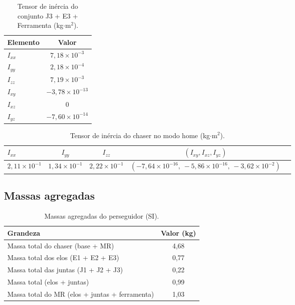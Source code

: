 \begin{table}[H]
\centering
\caption{Tensor de inércia do conjunto J3 + E3 + Ferramenta (kg$\cdot$m$^2$).}
\label{tab:B14_I_J3E3F}
\begin{tabular}{lc}
\hline
\textbf{Elemento} & \textbf{Valor} \\
\hline
$I_{xx}$ & $7,18\times 10^{-3}$ \\
$I_{yy}$ & $2,18\times 10^{-4}$ \\
$I_{zz}$ & $7,19\times 10^{-3}$ \\
$I_{xy}$ & $-3,78\times 10^{-13}$ \\
$I_{xz}$ & $0$ \\
$I_{yz}$ & $-7,60\times 10^{-14}$ \\
\hline
\end{tabular}
\end{table}


\begin{table}[H]
\centering
\caption{Tensor de inércia do chaser no modo home (kg$\cdot$m$^2$).}
\label{tab:chaser_I_home_SI}
\begin{tabular}{lcccc}
\hline
$I_{xx}$ & $I_{yy}$ & $I_{zz}$ & $(I_{xy}, I_{xz}, I_{yz})$ \\
\hline
$2,11\times 10^{-1}$ &
$1,34\times 10^{-1}$ &
$2,22\times 10^{-1}$ &
$(-7,64\times 10^{-16},\ -5,86\times 10^{-16},\ -3,62\times 10^{-2})$ \\
\hline
\end{tabular}
\end{table}

\subsection{Massas agregadas}

\begin{table}[H]
\centering
\caption{Massas agregadas do perseguidor (SI).}
\label{tab:chaser_massas_agregadas_SI}
\begin{tabular}{lc}
\hline
\textbf{Grandeza} & \textbf{Valor (kg)} \\
\hline
Massa total do chaser (base + MR) & 4,68 \\
Massa total dos elos (E1 + E2 + E3) & 0,77 \\
Massa total das juntas (J1 + J2 + J3) & 0,22 \\
Massa total (elos + juntas) & 0,99 \\
Massa total do MR (elos + juntas + ferramenta) & 1,03 \\
\hline
\end{tabular}
\end{table}

